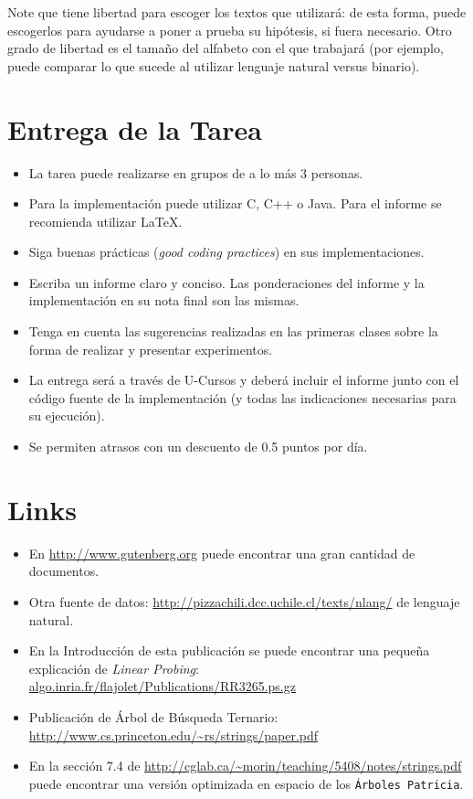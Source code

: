 \documentclass[dcc,uchile]{fcfmcourse}
\begin{document}
Note que tiene libertad para escoger los textos que utilizará: de esta forma, puede escogerlos para ayudarse a poner a prueba su hipótesis, si fuera necesario. Otro grado de libertad es el tamaño del alfabeto con el que trabajará (por ejemplo, puede comparar lo que sucede al utilizar lenguaje natural versus binario).
\section{Entrega de la Tarea}
\begin{itemize}
    \item La tarea puede realizarse en grupos de a lo más 3 personas.
    \item Para la implementación puede utilizar C, C++ o Java. Para el informe se recomienda utilizar \LaTeX .
    \item Siga buenas prácticas (\textit{good coding practices}) en sus implementaciones.
    \item Escriba un informe claro y conciso. Las ponderaciones del informe y la implementación en su nota final son las mismas.
    \item Tenga en cuenta las sugerencias realizadas en las primeras clases sobre la forma de realizar y presentar experimentos.
    \item La entrega será a través de U-Cursos y deberá incluir el informe junto con el código fuente de la implementación (y todas las indicaciones necesarias para su ejecución).
    \item Se permiten atrasos con un descuento de 0.5 puntos por día.
\end{itemize}
\section{Links}
\begin{itemize}
    \item En \href{http://www.gutenberg.org}{http://www.gutenberg.org} puede encontrar una gran cantidad de documentos.
    \item Otra fuente de datos: \href{http://pizzachili.dcc.uchile.cl/texts/nlang/}{http://pizzachili.dcc.uchile.cl/texts/nlang/} de lenguaje natural.
    \item En la Introducción de esta publicación se puede encontrar una pequeña explicación de \textit{Linear Probing}: \url{algo.inria.fr/flajolet/Publications/RR3265.ps.gz}
    \item Publicación de Árbol de Búsqueda Ternario: \url{http://www.cs.princeton.edu/~rs/strings/paper.pdf}
    \item En la sección 7.4 de \url{http://cglab.ca/~morin/teaching/5408/notes/strings.pdf} puede encontrar una versión optimizada en espacio de los \texttt{Árboles Patricia}.
\end{itemize}
\end{document}
